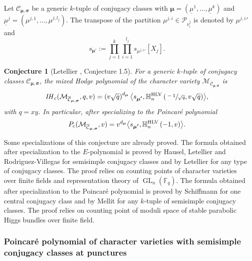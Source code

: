 \documentclass[JEP,XML,SOM,NoEqCountersInSection,Unicode,published]{cedram}
\newcommand{\rc}{\mathrm{c}}
\newcommand{\HLV}{\textup{HLV}}
\newcommand{\blangle}{\bigl\langle}
\newcommand{\brangle}{\bigr\rangle}
\theoremstyle{definition}
\theoremstyle{plain}
\newtheorem{conjecture}[definition]{Conjecture}
\DeclareMathOperator{\GL}{GL}
\newcommand{\IH}{\mathit{IH}}
\newcommand{\Part}{\mathcal{P}}
\begin{document}
Let $\mathcal{C}_{\boldsymbol{\mu},\boldsymbol{\sigma}}$ be a generic $k$-tuple of conjugacy classes with $\boldsymbol{\mu}=(\underline{\mu}^1,\dots,\underline{\mu}^k)$ and $\underline{\mu}^j=\left(\mu^{j,1},\dots,\mu^{j,l_j}\right)$. The transpose of the partition $\mu^{j,i}\in \Part_{\nu^j_i}$ is denoted by ${\mu^{j,i}}'$ and
\begin{equation}\label{eq_s_boldmu}
s_{\boldsymbol{\mu'}}:=\prod_{j=1}^k \prod_{i=1}^{l_j} s_{ {\mu^{j,i}}' }[X_j].
\end{equation}
\begin{conjecture}[Letellier \cite{Letellier13}, Conjecture 1.5]\label{conjecture_ic_char}
For a generic $k$-tuple of conjugacy classes $\mathcal{C}_{\boldsymbol{\mu},\boldsymbol{\sigma}}$, the mixed Hodge polynomial of the character variety $\mathcal{M}_{\overline{\mathcal{C}}_{\boldsymbol{\mu},\boldsymbol{\sigma}}}$ is
\[
\IH_\rc (\mathcal{M}_{\overline{\mathcal{C}}_{\boldsymbol{\mu},\boldsymbol{\sigma}}}, q, v) = \left(v \sqrt{q}\right)^{d_{\boldsymbol{\mu}}} \blangle s_{\boldsymbol{\mu'}}, \mathbb{H}_n^{\HLV}\left(\sfrac{-1}{\sqrt{q}},v\sqrt{q}\right)\brangle,
\]
with $q=x y$. In particular, after specializing to the Poincaré polynomial
\begin{equation}\label{eq_poincare_poly}
P_{\rc} (\mathcal{M}_{\overline{\mathcal{C}}_{\boldsymbol{\mu},\boldsymbol{\sigma}}}, v) = v^{d_{\boldsymbol{\mu}}}\blangle s_{\boldsymbol{\mu'}}, \mathbb{H}_n^{\HLV}\left(-1,v\right)\brangle.
\end{equation}
\end{conjecture}

Some specializations of this conjecture are already proved. The formula obtained after specialization to the $E$-polynomial is proved by Hausel, Letellier and Rodriguez-Villegas \cite{Hausel_Letellier_Villegas} for semisimple conjugacy classes and by Letellier \cite{Letellier13} for any type of conjugacy classes.
The proof relies on counting points of character varieties over finite fields and representation theory of $\GL_n(\mathbb{F}_q)$.
The formula obtained after specialization to the Poincaré polynomial is proved by Schiffmann \cite{Schiffmann16} for one central conjugacy class and by Mellit \cite{Mellit2020} for any $k$-tuple of semisimple conjugacy classes.
The proof relies on counting point of moduli space of stable parabolic Higgs bundles over finite field.

\subsubsection{Poincaré polynomial of character varieties with semisimple conjugacy classes at punctures}\label{subsect_poincare_ss}
\end{document}
